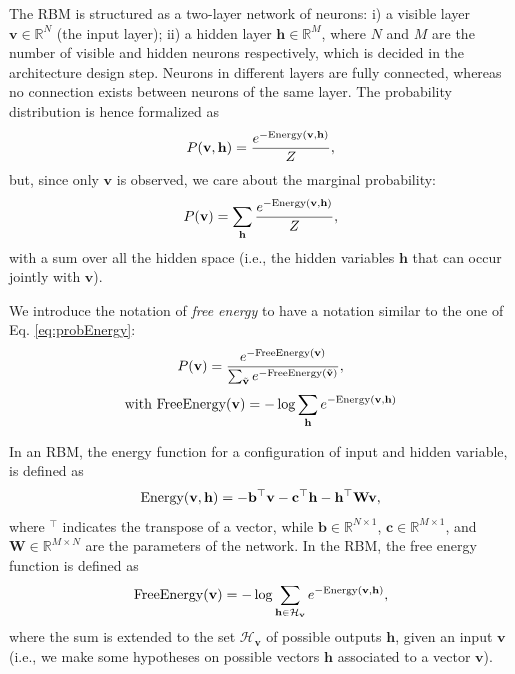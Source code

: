 The RBM is structured as a two-layer network of neurons: i) a visible layer $\mathbf{v} \in \mathbb{R}^{N}$ (the input layer); ii) a hidden layer $\mathbf{h} \in \mathbb{R}^{M}$, where $N$ and $M$ are the number of visible and hidden neurons respectively, which is decided in the architecture design step. Neurons in different layers are fully connected, whereas no connection exists between neurons of the same layer. The probability distribution is hence formalized as 
\begin{equation}
P(\mathbf{v},\mathbf{h})=\frac{e^{-\text{Energy}(\mathbf{v},\mathbf{h})}}{Z},
\end{equation}
but, since only $\mathbf{v}$ is observed, we care about the marginal probability:
\begin{equation}
P(\mathbf{v})=\sum_\mathbf{h} \frac{e^{-\text{Energy}(\mathbf{v},\mathbf{h})}}{Z},
\end{equation}
with a sum over all the hidden space (i.e., the hidden variables $\mathbf{h}$ that can occur jointly with $\mathbf{v}$).

We introduce the notation of \textit{free energy} to have a notation similar to the one of Eq. \ref{eq:probEnergy}:
\begin{equation}
P(\mathbf{v})=\frac{e^{-\text{FreeEnergy}(\mathbf{v})}}{\sum_{\tilde{\mathbf{v}}}e^{-\text{FreeEnergy}(\tilde{\mathbf{v}})}},
\end{equation}
\begin{equation}
\text{with }\text{FreeEnergy}(\mathbf{v})=-\log\sum_\mathbf{h} e^{-\text{Energy}(\mathbf{v},\mathbf{h})}
\label{eq:LLFs:freeenergy}
\end{equation}

In an RBM, the energy function for a configuration of input and hidden variable, is defined as \cite{Bengio2009}
\begin{equation}
\text{Energy}(\mathbf{v},\mathbf{h}) = -\mathbf{b}^\top\mathbf{v} -\mathbf{c}^\top\mathbf{h}-\mathbf{h}^\top\mathbf{W}\mathbf{v},
\label{eq:HLFs:energyRBM}
\end{equation}
where $^\top$ indicates the transpose of a vector, while $\mathbf{b} \in \mathbb{R}^{N \times 1}$, $\mathbf{c} \in \mathbb{R}^{M\times 1}$, and $\mathbf{W} \in \mathbb{R}^{M \times N}$ are the parameters of the network. %
In the RBM, the free energy function is defined as \cite{Bengio2009}
\begin{equation}
\text{FreeEnergy}(\mathbf{v}) = -\log \sum_{\mathbf{h} \in \mathcal{H}_\mathbf{v}}e^{-\text{Energy}(\mathbf{v},\mathbf{h})},
\end{equation}
where the sum is extended to the set $\mathcal{H}_\mathbf{v}$ of possible outputs $\mathbf{h}$, given an input $\mathbf{v}$ (i.e., we make some hypotheses on possible vectors $\mathbf{h}$ associated to a vector $\mathbf{v}$). 

